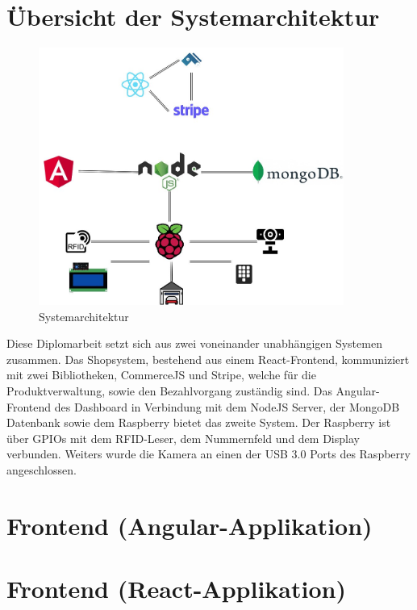 \section{Übersicht der Systemarchitektur}
\begin{figure}[h]
    \centering
    \includegraphics[width=10cm]{pics/APERTASystemarchitektur.jpg}
    \caption{Systemarchitektur}
    \end{figure}
Diese Diplomarbeit setzt sich aus zwei voneinander unabhängigen Systemen zusammen. Das Shopsystem, bestehend aus einem React-Frontend, kommuniziert mit zwei Bibliotheken, CommerceJS und Stripe, welche für die Produktverwaltung, sowie den Bezahlvorgang zuständig sind. Das Angular-Frontend des Dashboard in Verbindung mit dem NodeJS Server, der MongoDB Datenbank sowie dem Raspberry bietet das zweite System.
Der Raspberry ist über GPIOs mit dem RFID-Leser, dem Nummernfeld und dem Display verbunden. Weiters wurde die Kamera an einen der USB 3.0 Ports des Raspberry angeschlossen.
\section{Frontend (Angular-Applikation)}

\section{Frontend (React-Applikation)}
